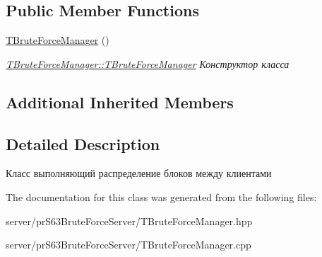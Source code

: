 \subsection*{Public Member Functions}
\begin{DoxyCompactItemize}
\item 
\mbox{\label{classserver_1_1_t_brute_force_manager_ac7c9f1590534d38fe05c422e7fada979}} 
\hyperlink{classserver_1_1_t_brute_force_manager_ac7c9f1590534d38fe05c422e7fada979}{T\+Brute\+Force\+Manager} ()
\begin{DoxyCompactList}\small\item\em \hyperlink{classserver_1_1_t_brute_force_manager_ac7c9f1590534d38fe05c422e7fada979}{T\+Brute\+Force\+Manager\+::\+T\+Brute\+Force\+Manager} Конструктор класса \end{DoxyCompactList}\end{DoxyCompactItemize}
\subsection*{Additional Inherited Members}


\subsection{Detailed Description}
Класс выполняющий распределение блоков между клиентами 

The documentation for this class was generated from the following files\+:\begin{DoxyCompactItemize}
\item 
server/pr\+S63\+Brute\+Force\+Server/T\+Brute\+Force\+Manager.\+hpp\item 
server/pr\+S63\+Brute\+Force\+Server/T\+Brute\+Force\+Manager.\+cpp\end{DoxyCompactItemize}
